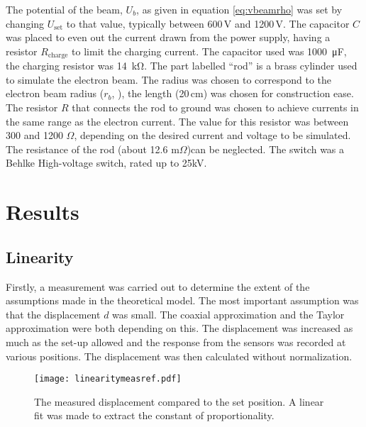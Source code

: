 The potential of the beam, $U_b$, as given in equation \ref{eq:vbeamrho} was set by changing $U_\text{set}$ to that value, typically between 600\,V and 1200\,V. The capacitor $C$ was placed to even out the current drawn from the power supply, having a resistor $R_\text{charge}$ to limit the charging current. The capacitor used was \SI{1000}{\micro\farad}, the charging resistor was \SI{14}{\kilo\ohm}.
The part labelled ``rod'' is a brass cylinder used to simulate the electron beam. The radius was chosen to correspond to the electron beam radius ($r_b$, ), the length (20\,cm) was chosen for construction ease.
The resistor $R$ that connects the rod to ground was chosen to achieve currents in the same range as the electron current. The value for this resistor was between 300 and 1200 $\Omega$, depending on the desired current and voltage to be simulated. The resistance of the rod (about 12.6 m$\Omega$)can be neglected.
The switch was a Behlke High-voltage switch, rated up to 25kV.

\section{Results}

\subsection{Linearity}
Firstly, a measurement was carried out to determine the extent of the assumptions made in the theoretical model. The most important assumption was that the displacement $d$ was small. The coaxial approximation and the Taylor approximation were both depending on this. The displacement was increased as much as the set-up allowed and the response from the sensors was recorded at various positions. The displacement was then calculated without normalization. 
\begin{figure}[h]
\centering
\texttt{[image: linearitymeasref.pdf]}
\caption{The measured displacement compared to the set position. A linear fit was made to extract the constant of proportionality.}
\label{fig:linearitymeas}
\end{figure}

